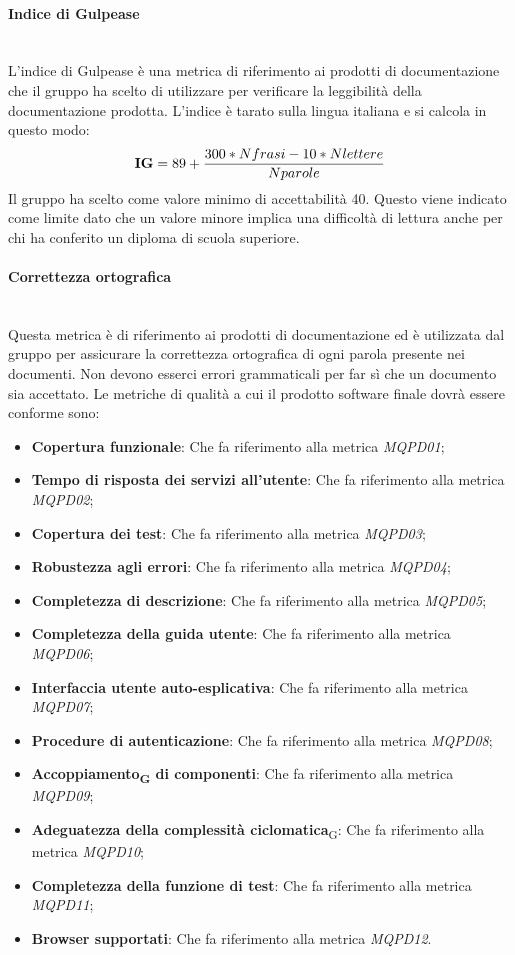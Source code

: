 \paragraph{Indice di Gulpease}\mbox{}\\
L'indice di Gulpease è una metrica di riferimento ai prodotti di documentazione che il gruppo ha scelto di utilizzare per verificare la leggibilità della documentazione prodotta. L'indice è tarato sulla lingua italiana e si calcola in questo modo:
\begin{align*}
	\centering
	\textbf{IG} = 89 + \frac{300 * Nfrasi - 10 * Nlettere}{Nparole}
\end{align*}
Il gruppo ha scelto come valore minimo di accettabilità 40. Questo viene indicato come limite dato che un valore minore implica una difficoltà di lettura anche per chi ha conferito un diploma di scuola superiore.
\paragraph{Correttezza ortografica}\mbox{}\\
Questa metrica è di riferimento ai prodotti di documentazione ed è utilizzata dal gruppo per assicurare la correttezza ortografica di ogni parola presente nei documenti. Non devono esserci errori grammaticali per far sì che un documento sia accettato.
Le metriche di qualità a cui il prodotto software finale dovrà essere conforme sono:
\begin{itemize}
	\item \textbf{Copertura funzionale}: Che fa riferimento alla metrica \textit{MQPD01};
	\item \textbf{Tempo di risposta dei servizi all'utente}: Che fa riferimento alla metrica \textit{MQPD02};
	\item \textbf{Copertura dei test}: Che fa riferimento alla metrica \textit{MQPD03};
	\item \textbf{Robustezza agli errori}: Che fa riferimento alla metrica \textit{MQPD04};
	\item \textbf{Completezza di descrizione}: Che fa riferimento alla metrica \textit{MQPD05};
	\item \textbf{Completezza della guida utente}: Che fa riferimento alla metrica \textit{MQPD06};
	\item \textbf{Interfaccia utente auto-esplicativa}: Che fa riferimento alla metrica \textit{MQPD07};
	\item \textbf{Procedure di autenticazione}: Che fa riferimento alla metrica \textit{MQPD08};
	\item \textbf{Accoppiamento\textsubscript{G} di componenti}: Che fa riferimento alla metrica \textit{MQPD09};
	\item \textbf{Adeguatezza della complessità ciclomatica}\textsubscript{G}: Che fa riferimento alla metrica \textit{MQPD10};
	\item \textbf{Completezza della funzione di test}: Che fa riferimento alla metrica \textit{MQPD11};
	\item \textbf{Browser supportati}: Che fa riferimento alla metrica \textit{MQPD12}.
\end{itemize}
